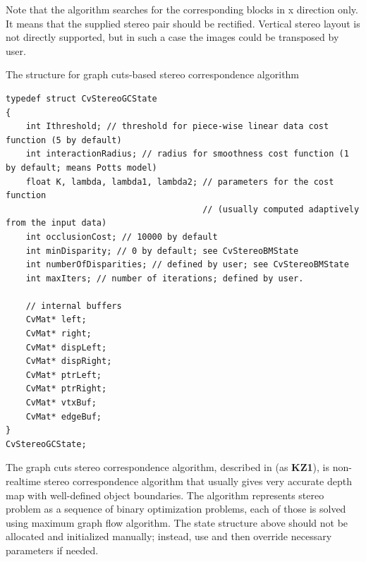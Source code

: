 Note that the algorithm searches for the corresponding blocks in x direction only. It means that the supplied stereo pair should be rectified. Vertical stereo layout is not directly supported, but in such a case the images could be transposed by user.

The structure for graph cuts-based stereo correspondence algorithm

\ifC
\begin{lstlisting}
typedef struct CvStereoGCState
{
    int Ithreshold; // threshold for piece-wise linear data cost function (5 by default)
    int interactionRadius; // radius for smoothness cost function (1 by default; means Potts model)
    float K, lambda, lambda1, lambda2; // parameters for the cost function
                                       // (usually computed adaptively from the input data)
    int occlusionCost; // 10000 by default
    int minDisparity; // 0 by default; see CvStereoBMState
    int numberOfDisparities; // defined by user; see CvStereoBMState
    int maxIters; // number of iterations; defined by user.

    // internal buffers
    CvMat* left;
    CvMat* right;
    CvMat* dispLeft;
    CvMat* dispRight;
    CvMat* ptrLeft;
    CvMat* ptrRight;
    CvMat* vtxBuf;
    CvMat* edgeBuf;
}
CvStereoGCState;
\end{lstlisting}
\else
\begin{description}
\end{description}
\fi

The graph cuts stereo correspondence algorithm, described in \cite{Kolmogorov03} (as \textbf{KZ1}), is non-realtime stereo correspondence algorithm that usually gives very accurate depth map with well-defined object boundaries. The algorithm represents stereo problem as a sequence of binary optimization problems, each of those is solved using maximum graph flow algorithm. The state structure above should not be allocated and initialized manually; instead, use  and then override necessary parameters if needed.

